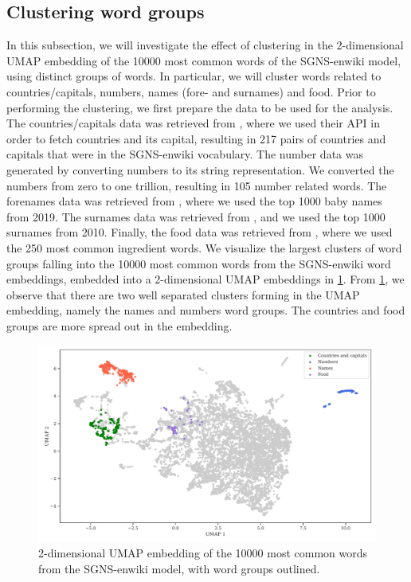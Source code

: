 \subsection{Clustering word groups}
In this subsection, we will investigate the effect of clustering in the 2-dimensional UMAP embedding of the 10000 most common words of the SGNS-enwiki model, using distinct groups of words. In particular, we will cluster words related to countries/capitals, numbers, names (fore- and surnames) and food. Prior to performing the clustering, we first prepare the data to be used for the analysis. The countries/capitals data was retrieved from \cite{GeoNames}, where we used their API in order to fetch countries and its capital, resulting in 217 pairs of countries and capitals that were in the SGNS-enwiki vocabulary. The number data was generated by converting numbers to its string representation. We converted the numbers from zero to one trillion, resulting in 105 number related words. The forenames data was retrieved from \cite{SSABabyNames}, where we used the top 1000 baby names from 2019. The surnames data was retrieved from \cite{CensusSurnames}, and we used the top 1000 surnames from 2010. Finally, the food data was retrieved from \cite{FoodIngredientList}, where we used the 250 most common ingredient words. We visualize the largest clusters of word groups falling into the 10000 most common words from the SGNS-enwiki word embeddings, embedded into a 2-dimensional UMAP embeddings in \cref{fig:word-cluster-all-groups}. From \cref{fig:word-cluster-all-groups}, we observe that there are two well separated clusters forming in the UMAP embedding, namely the names and numbers word groups. The countries and food groups are more spread out in the embedding.
\begin{figure}[H]
    \centering
    \includegraphics[width=\textwidth]{thesis/figures/word-cluster-all-groups.pdf}
    \caption{2-dimensional UMAP embedding of the 10000 most common words from the SGNS-enwiki model, with word groups outlined.}
    \label{fig:word-cluster-all-groups}
\end{figure}

